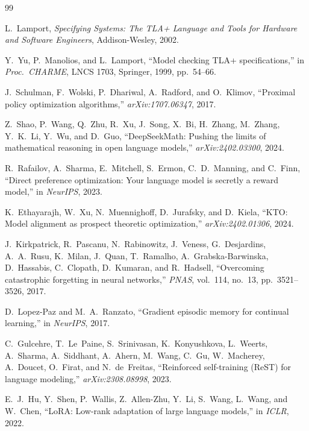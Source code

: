 \documentclass[11pt]{article}
\begin{document}
\begin{thebibliography}{99}
\small

L.~Lamport, \emph{Specifying Systems: The TLA+ Language and Tools for
Hardware and Software Engineers}, Addison-Wesley, 2002.

Y.~Yu, P.~Manolios, and L.~Lamport, ``Model checking TLA+
specifications,'' in \emph{Proc.\ CHARME}, LNCS 1703, Springer,
1999, pp.~54--66.

J.~Schulman, F.~Wolski, P.~Dhariwal, A.~Radford, and O.~Klimov,
``Proximal policy optimization algorithms,'' \emph{arXiv:1707.06347},
2017.

Z.~Shao, P.~Wang, Q.~Zhu, R.~Xu, J.~Song, X.~Bi, H.~Zhang, M.~Zhang,
Y.~K.~Li, Y.~Wu, and D.~Guo,
``DeepSeekMath: Pushing the limits of mathematical reasoning in open
language models,'' \emph{arXiv:2402.03300}, 2024.

R.~Rafailov, A.~Sharma, E.~Mitchell, S.~Ermon, C.~D.~Manning, and
C.~Finn, ``Direct preference optimization: Your language model is
secretly a reward model,'' in \emph{NeurIPS}, 2023.

K.~Ethayarajh, W.~Xu, N.~Muennighoff, D.~Jurafsky, and
D.~Kiela, ``KTO: Model alignment as prospect theoretic
optimization,'' \emph{arXiv:2402.01306}, 2024.

J.~Kirkpatrick, R.~Pascanu, N.~Rabinowitz, J.~Veness, G.~Desjardins,
A.~A.~Rusu, K.~Milan, J.~Quan, T.~Ramalho, A.~Grabska-Barwinska,
D.~Hassabis, C.~Clopath, D.~Kumaran, and R.~Hadsell,
``Overcoming catastrophic forgetting in neural networks,'' \emph{PNAS},
vol.~114, no.~13, pp.~3521--3526, 2017.

D.~Lopez-Paz and M.~A.~Ranzato, ``Gradient episodic memory for
continual learning,'' in \emph{NeurIPS}, 2017.

C.~Gulcehre, T.~Le~Paine, S.~Srinivasan, K.~Konyushkova, L.~Weerts,
A.~Sharma, A.~Siddhant, A.~Ahern, M.~Wang, C.~Gu, W.~Macherey,
A.~Doucet, O.~Firat, and N.~de~Freitas,
``Reinforced self-training (ReST) for language modeling,''
\emph{arXiv:2308.08998}, 2023.

E.~J.~Hu, Y.~Shen, P.~Wallis, Z.~Allen-Zhu, Y.~Li, S.~Wang, L.~Wang,
and W.~Chen, ``LoRA: Low-rank adaptation of large language models,''
in \emph{ICLR}, 2022.


\end{thebibliography}
\end{document}
